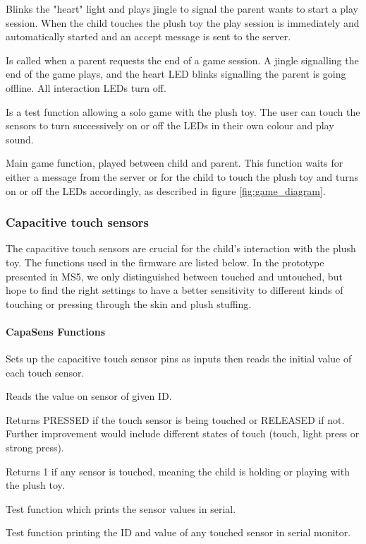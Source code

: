 \begin{description}[align=left]
\item[accept\_game\_request] Blinks the "heart" light and plays jingle to signal the parent wants to start a play session. When the child touches the plush toy the play session is immediately and automatically started and an accept message is sent to the server. 
\item[end\_game\_session] Is called when a parent requests the end of a game session. A jingle signalling the end of the game plays, and the heart LED blinks signalling the parent is going offline. All interaction LEDs turn off. 
\item[solo\_game] Is a test function allowing a solo game with the plush toy. The user can touch the sensors to turn successively on or off the LEDs in their own colour and play sound.
\item[parent\_game] Main game function, played between child and parent. This function waits for either a message from the server or for the child to touch the plush toy and turns on or off the LEDs accordingly, as described in figure \ref{fig:game_diagram}. 
\end{description}

\subsubsection{Capacitive touch sensors}\label{sec:capa_sens}

The capacitive touch sensors are crucial for the child's interaction with the plush toy. The functions used in the firmware are listed below. In the prototype presented in MS5, we only distinguished between touched and untouched, but hope to find the right settings to have a better sensitivity to different kinds of touching or pressing through the skin and plush stuffing. 

\paragraph{CapaSens Functions} 

\begin{description}[align=left]
\item[setup\_capa] Sets up the capacitive touch sensor pins as inputs then reads the initial value of each touch sensor.
\item[touch\_read\_value(touch\_id)] Reads the value on sensor of given ID. 
\item[capa\_touched(touch\_id)] Returns PRESSED if the touch sensor is being touched or RELEASED if not. Further improvement would include different states of touch (touch, light press or strong press).
\item[presence] Returns 1 if any sensor is touched, meaning the child is holding or playing with the plush toy.
\item[test\_touch\_values] Test function which prints the sensor values in serial.
\item[test\_if\_touched] Test function printing  the ID and value of any touched sensor in serial monitor.
\end{description}
    
